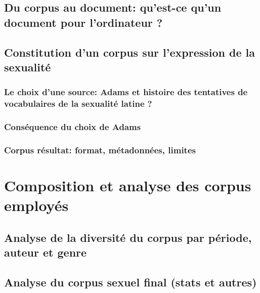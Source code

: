 \subsection{Du corpus au document: qu’est-ce qu’un document pour l’ordinateur ?}


\subsection{Constitution d’un corpus sur l’expression de la sexualité}

\subsubsection{Le choix d’une source: Adams et histoire des tentatives de vocabulaires de la sexualité latine ?}


\subsubsection{Conséquence du choix de Adams}



\subsubsection{Corpus résultat: format, métadonnées, limites}



\section{Composition et analyse des corpus employés}

\subsection{Analyse de la diversité du corpus par période, auteur et genre}


\subsection{Analyse du corpus sexuel final (stats et autres)}
